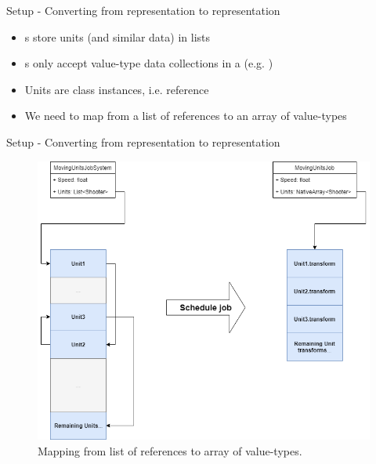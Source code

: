 \begin{frame}[fragile]{\secname}{\subsecname}
	Setup - Converting from  representation to  representation
	\begin{itemize}
		\item {}s store units (and similar data) in lists
		\item {}s only accept value-type data collections in a  (e.g. )
		\item Units are class instances, i.e. reference
		\item We need to map from a list of references to an array of value-types
	\end{itemize}
\end{frame}

\begin{frame}{\secname}{\subsecname}
	Setup - Converting from  representation to  representation
	\begin{figure}[h!]
        \centering
        \includegraphics[width=.7\textwidth]{pictures/concurrent-memory-layout.png}
        \caption{Mapping from list of references to array of value-types.}
    \end{figure}
\end{frame}

